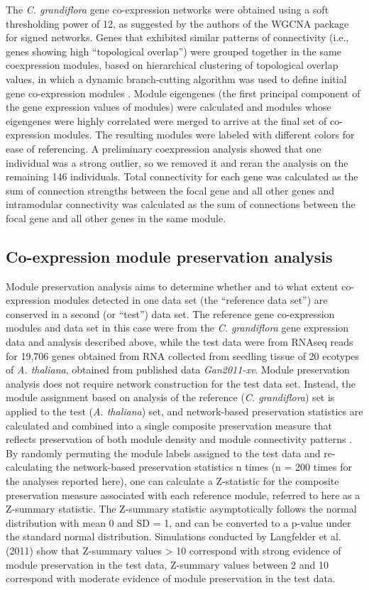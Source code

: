 The \textit{C. grandiflora} gene co-expression networks were obtained using  a soft thresholding power of 12, as suggested by the authors of the WGCNA package for signed networks. Genes that exhibited similar patterns of connectivity (i.e., genes showing high “topological overlap”) were grouped together in the same coexpression modules, based on hierarchical clustering of topological overlap values, in which a dynamic branch-cutting algorithm was used to define initial gene co-expression modules \citep{langfelder2008}.  Module eigengenes (the first principal component of the gene expression values of modules) were calculated and modules whose eigengenes were highly correlated were merged to arrive at the final set of co-expression modules. The resulting modules were labeled with different colors for ease of referencing. A preliminary coexpression analysis showed that one individual was a strong outlier, so we removed it and reran the analysis on the remaining 146 individuals. Total connectivity for each gene was calculated as the sum of connection strengths between the focal gene and all other genes and intramodular connectivity was calculated as the sum of connections between the focal gene and all other genes in the same module. 

\subsection{Co-expression module preservation analysis}
Module preservation analysis aims to determine whether and to what extent co-expression modules detected in one data set (the “reference data set”) are conserved in a second (or “test”) data set. The reference gene co-expression modules and data set in this case were from the \textit{C. grandiflora} gene expression data and analysis described above, while the test data were from RNAseq reads for 19,706 genes obtained from RNA collected from seedling tissue of 20 ecotypes of \textit{A. thaliana}, obtained from published data \textit{Gan2011-xv}. Module preservation analysis does not require network construction for the test data set. Instead, the module assignment based on analysis of the reference (\textit{C. grandiflora}) set is applied to the test (\textit{A. thaliana}) set, and network-based preservation statistics are calculated and combined into a single composite preservation measure that reflects preservation of both module density and module connectivity patterns \citep{langfelder2011}. By randomly permuting the module labels assigned to the test data and re-calculating the network-based preservation statistics n times (n = 200 times for the analyses reported here), one can calculate a Z-statistic for the composite preservation measure associated with each reference module, referred to here as a Z-summary statistic.  The Z-summary statistic asymptotically follows the normal distribution with mean 0 and SD = 1, and can be converted to a p-value under the standard normal distribution.  Simulations conducted by Langfelder et al. (2011) show that Z-summary values > 10 correspond with strong evidence of module preservation in the test data, Z-summary values between 2 and 10 correspond with moderate evidence of module preservation in the test data.

